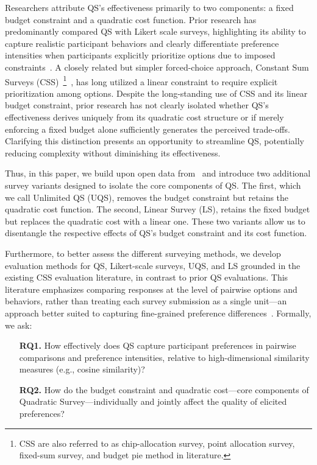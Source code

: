 Researchers attribute QS's effectiveness primarily to two components: a fixed budget constraint and a quadratic cost function. Prior research has predominantly compared QS with Likert scale surveys, highlighting its ability to capture realistic participant behaviors and clearly differentiate preference intensities when participants explicitly prioritize options due to imposed constraints~\cite{chengCanShowWhat2021, cavaille2024cares}. A closely related but simpler forced-choice approach, Constant Sum Surveys (CSS)~\footnote{CSS are also referred to as chip-allocation survey, point allocation survey, fixed-sum survey, and budget pie method in literature.}~\cite{metfesselProposalQuantitativeReporting1947}, has long utilized a linear constraint to require explicit prioritization among options. Despite the long-standing use of CSS and its linear budget constraint, prior research has not clearly isolated whether QS's effectiveness derives uniquely from its quadratic cost structure or if merely enforcing a fixed budget alone sufficiently generates the perceived trade-offs. Clarifying this distinction presents an opportunity to streamline QS, potentially reducing complexity without diminishing its effectiveness.


Thus, in this paper, we build upon open data from~\citet{illinoisdatabankIDB-1928463} and introduce two additional survey variants designed to isolate the core components of QS. The first, which we call Unlimited QS (UQS), removes the budget constraint but retains the quadratic cost function. The second, Linear Survey (LS), retains the fixed budget but replaces the quadratic cost with a linear one. These two variants allow us to disentangle the respective effects of QS’s budget constraint and its cost function.

Furthermore, to better assess the different surveying methods, we develop evaluation methods for QS, Likert-scale surveys, UQS, and LS grounded in the existing CSS evaluation literature, in contrast to prior QS evaluations. This literature emphasizes comparing responses at the level of pairwise options and behaviors, rather than treating each survey submission as a single unit—an approach better suited to capturing fine-grained preference differences~\cite{}. Formally, we ask:

\begin{itemize}
    \item [\textbf{RQ1.}] How effectively does QS capture participant preferences in pairwise comparisons and preference intensities, relative to high-dimensional similarity measures (e.g., cosine similarity)?
    \item [\textbf{RQ2.}] How do the budget constraint and quadratic cost---core components of Quadratic Survey---individually and jointly affect the quality of elicited preferences?
\end{itemize}

